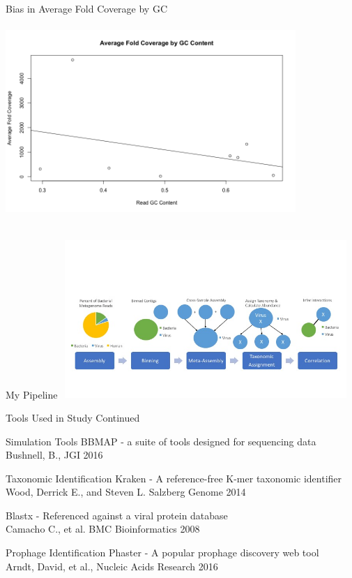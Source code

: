 \documentclass[11pt]{beamer}
\begin{document}
	
	\begin{frame}{Bias in Average Fold Coverage by GC}
	\includegraphics[height=8cm, width=11cm]{Viral_Coverage_by_GC.png}
	\end{frame}
	
	
	\begin{frame}{My Pipeline}
	\vspace{-1cm}
	\includegraphics[height=6cm, width=11cm]{figure_2_updated.jpg}
	\end{frame}
	
	
	\begin{frame}{Tools Used in Study Continued}
	\begin{block}{Simulation Tools}
	BBMAP - a suite of tools designed for sequencing data \\
	\tiny{Bushnell, B., JGI 2016}
	\end{block}
	
	\begin{block}{Taxonomic Identification}
	Kraken - A reference-free K-mer taxonomic identifier \\
	\tiny{Wood, Derrick E., and Steven L. Salzberg Genome 2014}
	
	\large{Blastx - Referenced against a viral protein database} \\
	\tiny{Camacho C., et al. BMC Bioinformatics 2008}
	\end{block}
	
	\begin{block}{Prophage Identification}
	Phaster - A popular prophage discovery web tool  \\
	\tiny{Arndt, David, et al., Nucleic Acids Research 2016}
	\end{block}
	\end{frame}
	
	
	
\end{document}
